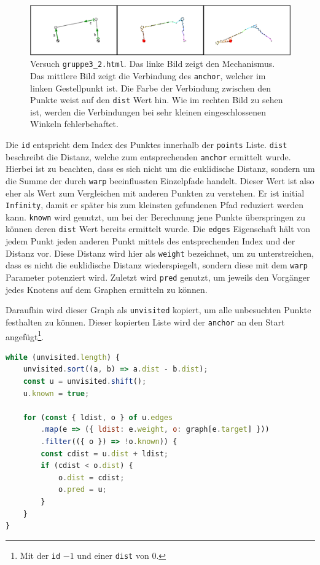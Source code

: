 \begin{figure}
    \centering
    \includegraphics[width=\textwidth]{gfx/dijkstra_edit.png}
    \caption[Versuch \lstinline{gruppe3_2.html}]{Versuch \lstinline{gruppe3_2.html}. Das linke Bild zeigt den Mechanismus. Das mittlere Bild zeigt die Verbindung des \lstinline{anchor}, welcher im linken Gestellpunkt ist. Die Farbe der Verbindung zwischen den Punkte weist auf den \lstinline{dist} Wert hin.
    Wie im rechten Bild zu sehen ist, werden die Verbindungen bei sehr kleinen eingeschlossenen Winkeln fehlerbehaftet.}
    \label{fig:gruppe3_1}
\end{figure}

Die \lstinline{id} entspricht dem Index des Punktes innerhalb der \lstinline{points} Liste.
\lstinline{dist} beschreibt die Distanz, welche zum entsprechenden \lstinline{anchor} ermittelt wurde.
Hierbei ist zu beachten, dass es sich nicht um die euklidische Distanz, sondern um die Summe der durch \lstinline{warp} beeinflussten Einzelpfade handelt.
Dieser Wert ist also eher als Wert zum Vergleichen mit anderen Punkten zu verstehen.
Er ist initial \lstinline{Infinity}, damit er später bis zum kleinsten gefundenen Pfad reduziert werden kann.
\lstinline{known} wird genutzt, um bei der Berechnung jene Punkte überspringen zu können deren \lstinline{dist} Wert bereits ermittelt wurde.
Die \lstinline{edges} Eigenschaft hält von jedem Punkt jeden anderen Punkt mittels des entsprechenden Index und der Distanz vor.
Diese Distanz wird hier als \lstinline{weight} bezeichnet, um zu unterstreichen, dass es nicht die euklidische Distanz wiederspiegelt, sondern diese mit dem \lstinline{warp} Parameter potenziert wird.
Zuletzt wird \lstinline{pred} genutzt, um jeweils den Vorgänger jedes Knotens auf dem Graphen ermitteln zu können.

Daraufhin wird dieser Graph als \lstinline{unvisited} kopiert, um alle unbesuchten Punkte festhalten zu können.
Dieser kopierten Liste wird der \lstinline{anchor} an den Start angefügt\footnote{Mit der \lstinline{id} $-1$ und einer \lstinline{dist} von 0.}.

\begin{lstlisting}[language=JavaScript, caption={Berechnung der \lstinline{dist} Eigenschaft der einzelnen Objekte aus dem Dijkstra-Graphen.}, label={lst:creation_dijkstra_graph}]
while (unvisited.length) {
    unvisited.sort((a, b) => a.dist - b.dist);
    const u = unvisited.shift();
    u.known = true;

    for (const { ldist, o } of u.edges
        .map(e => ({ ldist: e.weight, o: graph[e.target] }))
        .filter(({ o }) => !o.known)) {
        const cdist = u.dist + ldist;
        if (cdist < o.dist) {
            o.dist = cdist;
            o.pred = u;
        }
    }
}
\end{lstlisting}

